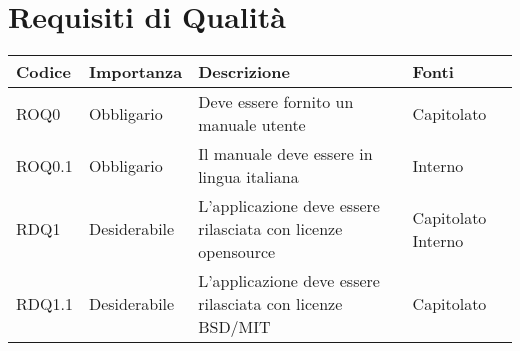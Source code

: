 \documentclass[../AnalisideiRequisiti.tex]{subfiles}
\begin{document}
	\section{Requisiti di Qualità}
			\begin{longtable}{| p{2cm} | p{2.5cm} |p{5cm} | p{2.5cm} |}
			\hline
			\textbf{Codice} & \textbf{Importanza} & \textbf{Descrizione} & \textbf{Fonti}\\
			\hline
			\endhead
				
			
			\newline ROQ0&\newline Obbligario&
			\newline Deve essere fornito un manuale utente&
			\newline Capitolato
			\\[1em]
			\hline
			\newline ROQ0.1&\newline Obbligario&
			\newline Il manuale deve essere in lingua italiana&
			\newline Interno
			\\[1em]
			\hline
			\newline
			RDQ1&\newline Desiderabile&
			\newline 
			L'applicazione deve essere rilasciata con licenze opensource&
			\newline Capitolato \newline Interno
			\\[1em]
			\hline	
			\newline
			RDQ1.1&\newline Desiderabile&
			\newline 
			L'applicazione deve essere rilasciata con licenze BSD/MIT &
			\newline Capitolato
			\\[1em]
			\hline
	\end{longtable}
\newpage
\end{document}

